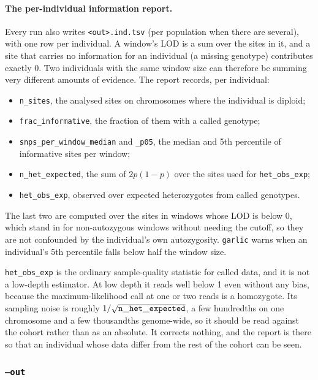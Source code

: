 \documentclass[12pt]{article}%
\begin{document}
\paragraph{The per-individual information report.}\label{sec:ind}  Every run also writes {\tt <out>.ind.tsv} (per population when there are several), with one row per individual.  A window's LOD is a sum over the sites in it, and a site that carries no information for an individual (a missing genotype) contributes exactly 0.  Two individuals with the same window size can therefore be summing very different amounts of evidence.  The report records, per individual:
\begin{itemize}
\item {\tt n\_sites}, the analysed sites on chromosomes where the individual is diploid;
\item {\tt frac\_informative}, the fraction of them with a called genotype;
\item {\tt snps\_per\_window\_median} and {\tt \_p05}, the median and 5th percentile of informative sites per window;
\item {\tt n\_het\_expected}, the sum of $2p(1-p)$ over the sites used for {\tt het\_obs\_exp};
\item {\tt het\_obs\_exp}, observed over expected heterozygotes from called genotypes.
\end{itemize}
\noindent The last two are computed over the sites in windows whose LOD is below 0, which stand in for non-autozygous windows without needing the cutoff, so they are not confounded by the individual's own autozygosity.  {\tt garlic} warns when an individual's 5th percentile falls below half the window size.

{\tt het\_obs\_exp} is the ordinary sample-quality statistic for called data, and it is not a low-depth estimator.  At low depth it reads well below 1 even without any bias, because the maximum-likelihood call at one or two reads is a homozygote.  Its sampling noise is roughly $1/\sqrt{\tt n\_het\_expected}$, a few hundredths on one chromosome and a few thousandths genome-wide, so it should be read against the cohort rather than as an absolute.  It corrects nothing, and the report is there so that an individual whose data differ from the rest of the cohort can be seen.

\subsubsection{{\tt --out}}
\end{document}
